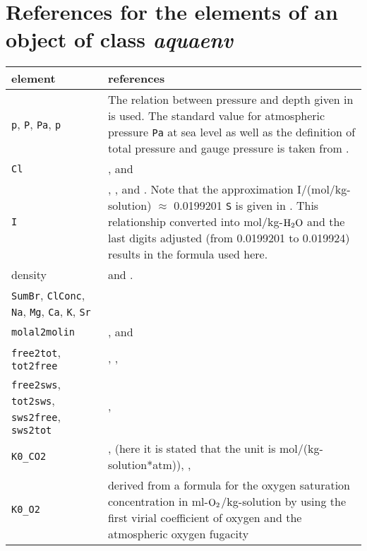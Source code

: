 \documentclass[article,nojss]{jss}
\begin{document}
\section{References for the elements of an object of class \textit{aquaenv}} \label{app: references}
\begin{footnotesize}
\begin{longtable}{p{}|p{}}
\textbf{element}& \textbf{references} \\ \hline 
\texttt{p}, \texttt{P}, \texttt{Pa}, \texttt{p} & The relation between pressure and depth given in \cite{Fofonoff1983} is used. The standard value for 
atmospheric pressure \texttt{Pa} at sea level as well as the definition of total pressure and gauge pressure is taken from \cite{Feistel2008}.\\
\texttt{Cl}          & \citet[ chapter 5, p. 11]{DOE1994}, and \citet[p. 100, footnote 3]{Zeebe2001}\\
\texttt{I}           & \citet[chapter 5, p. 13, 15]{DOE1994},  \citet[ p.12]{Zeebe2001}, and \citet[ p.257]{Roy1993b}. 
Note that the approximation I/(mol/kg-solution) $\approx$ 0.0199201 \; \texttt{S} is given in \citet[  p. 428.]{Millero1982}.
This relationship converted into mol/kg-$\rm H_2O$ and the last digits adjusted (from 0.0199201 to 0.019924) results in the formula used here.\\
density     & \citet{Millero1981} and \citet[chapter 5, p. 6f]{DOE1994}.\\
\texttt{SumBr}, \texttt{ClConc}, \texttt{Na}, \texttt{Mg}, \texttt{Ca}, \texttt{K}, \texttt{Sr} & \citet[ chapter 5, p.11]{DOE1994}\\    
\texttt{molal2molin} & \citet[ p.257]{Roy1993b}, and  \citet[chapter 5, p. 15]{DOE1994}\\
\texttt{free2tot}, \texttt{tot2free}  & \citet[p.2302]{Dickson1984}, \citet[ chapter 4, p.16]{DOE1994}, \citet[p.57, 261]{Zeebe2001}\\
\texttt{free2sws}, \texttt{tot2sws}, \texttt{sws2free}, \texttt{sws2tot} &  \citet[p.2303]{Dickson1984}, \citet[ p.57]{Zeebe2001}\\
\texttt{K0\_CO2}     & \citet{Weiss1974}, \citet[chapter 5, p. 13]{DOE1994} (here it is stated that the unit is mol/(kg-solution*atm)), \citet[ p.663]{Millero1995}, \citet[ p.257]{Zeebe2001}\\
\texttt{K0\_O2}      & derived from  a formula for the oxygen saturation concentration in ml-$\rm O_2$/kg-solution by \citet{Weiss1970} using the first virial coefficient
of oxygen \citep[][p. 41, 1029]{Atkins1996} and the atmospheric oxygen fugacity \citep{Williams2004}\\

\end{longtable}
\end{footnotesize}
\end{document}
